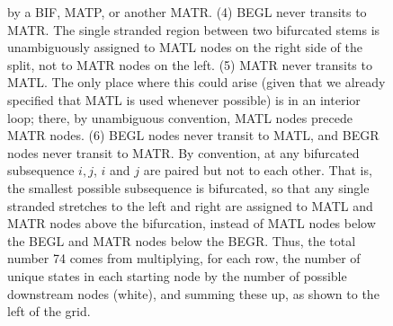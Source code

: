 \begin{figure}[htp]
{by a BIF, MATP, or another MATR. (4) BEGL never transits to MATR. The
single stranded region between two bifurcated stems is unambiguously
assigned to MATL nodes on the right side of the split, not to MATR
nodes on the left. (5) MATR never transits to MATL. The only place
where this could arise (given that we already specified that MATL is
used whenever possible) is in an interior loop; there, by unambiguous
convention, MATL nodes precede MATR nodes. (6) BEGL nodes never
transit to MATL, and BEGR nodes never transit to MATR. By convention,
at any bifurcated subsequence $i,j$, $i$ and $j$ are paired but not to
each other. That is, the smallest possible subsequence is bifurcated,
so that any single stranded stretches to the left and right are
assigned to MATL and MATR nodes above the bifurcation, instead of MATL
nodes below the BEGL and MATR nodes below the BEGR.
Thus, the total number 74 comes from multiplying, for each row, the
number of unique states in each starting node by the number of
possible downstream nodes (white), and summing these up, as shown to
the left of the grid.}
\label{fig:magic74}
\end{figure}